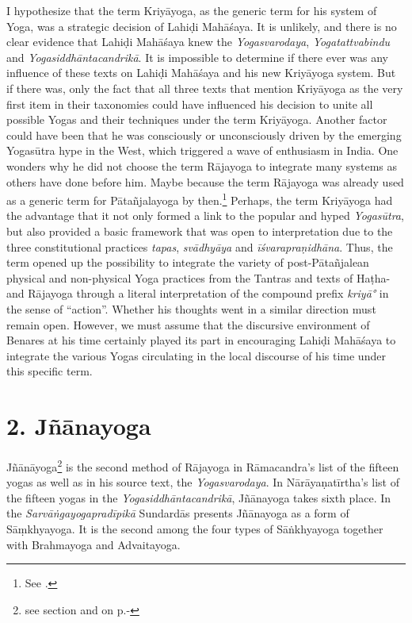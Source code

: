 I hypothesize that the term Kriyāyoga, as the generic term for his system of Yoga, was a strategic decision of Lahiḍi Mahāśaya. It is unlikely, and there is no clear evidence that Lahiḍi Mahāśaya knew the \textit{Yogasvarodaya}, \textit{Yogatattvabindu} and \textit{Yogasiddhāntacandrikā}. It is impossible to determine if there ever was any influence of these texts on Lahiḍi Mahāśaya and his new Kriyāyoga system. But if there was, only the fact that all three texts that mention Kriyāyoga as the very first item in their taxonomies could have influenced his decision to unite all possible Yogas and their techniques under the term Kriyāyoga. Another factor could have been that he was consciously or unconsciously driven by the emerging Yogasūtra hype in the West, which triggered a wave of enthusiasm in India. One wonders why he did not choose the term Rājayoga to integrate many systems as others have done before him. Maybe because the term Rājayoga was already used as a generic term for Pātañjalayoga by then.\footnote{See \citeauthor{birch2014}.} Perhaps, the term Kriyāyoga had the advantage that it not only formed a link to the popular and hyped \textit{Yogasūtra}, but also provided a basic framework that was open to interpretation due to the three constitutional practices \textit{tapas}, \textit{svādhyāya} and \textit{īśvarapraṇidhāna}. Thus, the term opened up the possibility to integrate the variety of post-Pātañjalean physical and non-physical Yoga practices from the Tantras and texts of Haṭha- and Rājayoga through a literal interpretation of the compound prefix \textit{kriyā°} in the sense of ``action''. Whether his thoughts went in a similar direction must remain open. However, we must assume that the discursive environment of Benares at his time certainly played its part in encouraging Lahiḍi Mahāśaya to integrate the various Yogas circulating in the local discourse of his time under this specific term.

\section{2. Jñānayoga}
\label{jnanayogaintro}

Jñānāyoga\footnote{see section  and  on p.\pageref{jnanayogastart}-\pageref{endsvabhava}} is the second method of Rājayoga in Rāmacandra's list of the fifteen yogas as well as in his source text, the \textit{Yogasvarodaya}. In Nārāyaṇatīrtha's list of the fifteen yogas in the \textit{Yogasiddhāntacandrikā}, Jñānayoga takes sixth place. In the \textit{Sarvāṅgayogapradīpikā} Sundardās presents Jñānayoga as a form of Sāṃkhyayoga. It is the second among the four types of Sāṅkhyayoga together with Brahmayoga and Advaitayoga.  

